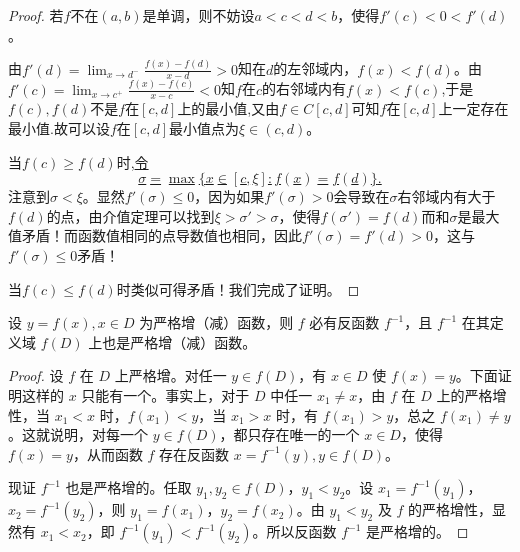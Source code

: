 \documentclass[../../main.tex]{subfiles}%
\begin{document}
\begin{proof}

若\(f\)不在\((a,b)\)是单调，则不妨设\(a < c < d < b\)，使得\(f'(c)<0<f'(d)\)。

由\(f'(d)=\lim_{x\rightarrow d^{-}}\frac{f(x)-f(d)}{x - d}>0\)知在\(d\)的左邻域内，\(f(x)<f(d)\)。由\(f'(c)=\lim_{x\rightarrow c^{+}}\frac{f(x)-f(c)}{x - c}<0\)知\(f\)在\(c\)的右邻域内有\(f(x)<f(c)\),于是$f(c),f(d)$不是$f$在$[c,d]$上的最小值,又由$f\in C[c,d]$可知$f$在$[c,d]$上一定存在最小值.故可以设\(f\)在\([c,d]\)最小值点为\(\xi\in(c,d)\)。

当\(f(c)\geqslant f(d)\)时,\hyperlink{令
sigma=max{x in[c,xi]:f(x)=f(d)}的原因
}{令
\[
\sigma=\max\{x\in[c,\xi]:f(x)=f(d)\}.
\]}
注意到\(\sigma<\xi\)。显然\(f'(\sigma)\leqslant0\)，因为如果\(f'(\sigma)>0\)会导致在\(\sigma\)右邻域内有大于\(f(d)\)的点，由介值定理可以找到\(\xi>\sigma'>\sigma\)，使得\(f(\sigma')=f(d)\)而和\(\sigma\)是最大值矛盾！而函数值相同的点导数值也相同，因此\(f'(\sigma)=f'(d)>0\)，这与\(f'(\sigma)\leqslant0\)矛盾！

当\(f(c)\leqslant f(d)\)时类似可得矛盾！我们完成了证明。

\end{proof}


\begin{theorem}[反函数存在定理]\label{theorem:反函数存在定理}
设 \( y = f(x), x \in D \) 为严格增（减）函数，则 \( f \) 必有反函数 \( f^{-1} \)，且 \( f^{-1} \) 在其定义域 \( f(D) \) 上也是严格增（减）函数。
\end{theorem}
\begin{proof}

设 \( f \) 在 \( D \) 上严格增。对任一 \( y \in f(D) \)，有 \( x \in D \) 使 \( f(x) = y \)。下面证明这样的 \( x \) 只能有一个。事实上，对于 \( D \) 中任一 \( x_1 \neq x \)，由 \( f \) 在 \( D \) 上的严格增性，当 \( x_1 < x \) 时，\( f(x_1) < y \)，当 \( x_1 > x \) 时，有 \( f(x_1) > y \)，总之 \( f(x_1) \neq y \)。这就说明，对每一个 \( y \in f(D) \)，都只存在唯一的一个 \( x \in D \)，使得 \( f(x) = y \)，从而函数 \( f \) 存在反函数 \( x = f^{-1}(y), y \in f(D) \)。

现证 \( f^{-1} \) 也是严格增的。任取 \( y_1, y_2 \in f(D) \)，\( y_1 < y_2 \)。设 \( x_1 = f^{-1}(y_1) \)，\( x_2 = f^{-1}(y_2) \)，则 \( y_1 = f(x_1) \)，\( y_2 = f(x_2) \)。由 \( y_1 < y_2 \) 及 \( f \) 的严格增性，显然有 \( x_1 < x_2 \)，即 \( f^{-1}(y_1) < f^{-1}(y_2) \)。所以反函数 \( f^{-1} \) 是严格增的。

\end{proof}
\end{document}
